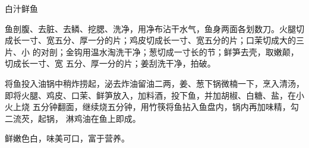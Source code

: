 \begin{recipe}{白汁鲜鱼}

\ingredients


\preparation

\step 鱼剖腹、去脏、去鳞、挖腮、洗净，用净布沾干水气，鱼身两面各划数刀。火腿切
成长一寸、宽五分、厚一分的片；鸡皮切成长一寸、宽五分的片；口茉切成大的三片、小
的对剖；金钩用温水淘洗干净；葱切成一寸长的节；鲜笋去壳，取嫩颠，切成长一寸、宽
五分、厚一分的片；姜刮洗干净，拍破。

\step 将鱼投入油锅中稍炸捞起，泌去炸油留油二两，姜、葱下锅微楠一下，烹入清汤，
即将火腿、鸡皮、口茉、鲜笋放入，加料酒，投下鱼，并加胡椒、白糖、盐，在小火上烧
五分钟翻面，继续烧五分钟，用竹筷将鱼拈入鱼盘内，锅内再加味精，勾二流芡，起锅，
淋鸡油在鱼上即成。

\features

鲜嫩色白，味美可口，富于营养。

\end{recipe}


